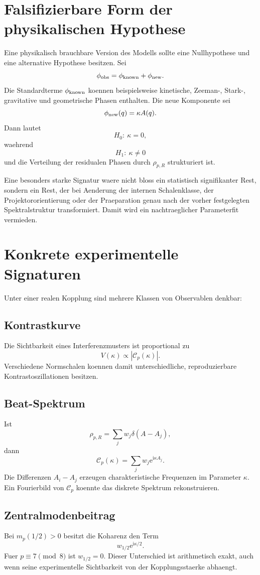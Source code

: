 \documentclass[11pt,a4paper]{article}
\theoremstyle{definition}
\newcommand{\ii}{\mathrm i}
\newcommand{\e}{\mathrm e}
\begin{document}
\section{Falsifizierbare Form der physikalischen Hypothese}
Eine physikalisch brauchbare Version des Modells sollte eine Nullhypothese und eine alternative Hypothese besitzen. Sei
\[
\phi_{\rm obs}
=\phi_{\rm known}+\phi_{\rm new}.
\]
Die Standardterme $\phi_{\rm known}$ koennen beispielsweise kinetische, Zeeman-, Stark-, gravitative und geometrische Phasen enthalten. Die neue Komponente sei
\[
\phi_{\rm new}(q)=\kappa A(q).
\]
Dann lautet
\[
H_0:\ \kappa=0,
\]
waehrend
\[
H_1:\ \kappa\neq0
\]
und die Verteilung der residualen Phasen durch $\rho_{p,R}$ strukturiert ist.

Eine besonders starke Signatur waere nicht bloss ein statistisch signifikanter Rest, sondern ein Rest, der bei Aenderung der internen Schalenklasse, der Projektororientierung oder der Praeparation genau nach der vorher festgelegten Spektralstruktur transformiert. Damit wird ein nachtraeglicher Parameterfit vermieden.

\section{Konkrete experimentelle Signaturen}
Unter einer realen Kopplung sind mehrere Klassen von Observablen denkbar:

\subsection{Kontrastkurve}
Die Sichtbarkeit eines Interferenzmusters ist proportional zu
\[
V(\kappa)\propto|\mathcal C_p(\kappa)|.
\]
Verschiedene Normschalen koennen damit unterschiedliche, reproduzierbare Kontrastoszillationen besitzen.

\subsection{Beat-Spektrum}
Ist
\[
\rho_{p,R}=\sum_j w_j\delta(A-A_j),
\]
dann
\[
\mathcal C_p(\kappa)=\sum_jw_j\e^{\ii\kappa A_j}.
\]
Die Differenzen $A_i-A_j$ erzeugen charakteristische Frequenzen im Parameter $\kappa$. Ein Fourierbild von $\mathcal C_p$ koennte das diskrete Spektrum rekonstruieren.

\subsection{Zentralmodenbeitrag}
Bei $m_p(1/2)>0$ besitzt die Koharenz den Term
\[
w_{1/2}\e^{\ii\kappa/2}.
\]
Fuer $p\equiv7\pmod8$ ist $w_{1/2}=0$. Dieser Unterschied ist arithmetisch exakt, auch wenn seine experimentelle Sichtbarkeit von der Kopplungsstaerke abhaengt.
\end{document}
